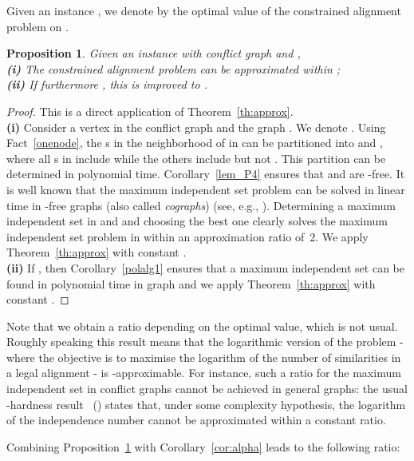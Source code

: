 \documentclass[final]{dmtcs-episciences}
\newtheorem{proposition}[theorem]{Proposition}
\newcommand\mar[1]{\textcolor{black}{#1}}
\begin{document}
Given an instance , we denote by  the optimal value of the constrained alignment problem on . 
\begin{proposition}\label{pro:approxsqrt}
Given an instance  with conflict graph  and ,\\
\textbf{(i)} The constrained alignment problem can be approximated within ;\\
\textbf{(ii)} If furthermore , this is improved to  .
\end{proposition}
\begin{proof}



This is a direct application of Theorem~\ref{th:approx}.\\
\textbf{(i)} Consider a vertex  in the conflict graph  and the graph . We denote . Using Fact~\ref{onenode},   
the s in the neighborhood of  in  can be partitioned into  and , where all s in  include  while the others include  but not . This partition can be determined in polynomial time.  
Corollary~\ref{lem_P4} ensures that  and  are -free. It is well known that the maximum independent set problem can be solved in linear time in -free graphs (also called {\em cographs}) (see, e.g., \citet{golumbicbook}). Determining a maximum independent set in  and  and choosing the best one clearly solves the maximum independent set problem in  \mar{} within an approximation ratio of~2. We apply Theorem~\ref{th:approx} with constant .\\
\textbf{(ii)} If , then Corollary~\ref{polalg1} ensures that a maximum independent set can be found in polynomial time in graph  and we apply Theorem~\ref{th:approx} with constant .
\end{proof}

Note that we obtain a ratio depending on the optimal value, which is not usual. Roughly speaking this result means that the logarithmic version of the problem \-- where the objective is to maximise the logarithm of the number of similarities in a legal alignment \-- is -approximable. For instance, such a ratio for the maximum independent set in conflict graphs cannot be achieved in general graphs: the usual -hardness result~ (\citet{hastad}) states that, under some complexity hypothesis, the logarithm of the independence number cannot be approximated within a constant ratio.

Combining Proposition~\ref{pro:approxsqrt} with Corollary~\ref{cor:alpha} leads to the following ratio:
\end{document}
